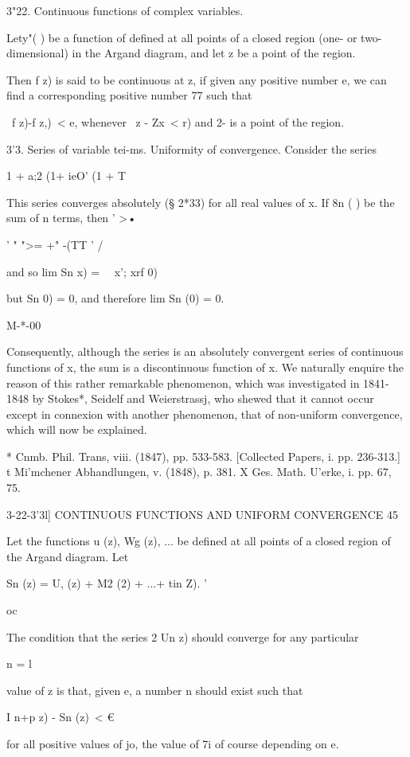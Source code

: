 3"22. Continuous functions of complex variables.

Lety"( ) be a function of defined at all points of a closed region
(one- or two-dimensional) in the Argand diagram, and let z be a point
of the region.

Then f z) is said to be continuous at z, if given any positive number
e, we can find a corresponding positive number 77 such that

\ f z)-f z,)\ < e, whenever \ z - Zx\ < r) and 2- is a point of the
region.

3'3. Series of variable tei-ms. Uniformity of convergence. Consider
the series

  1 + a;2 (1+ ieO' (1 + T

This series converges absolutely (§ 2*33) for all real values of x. If
8n ( ) be the sum of n terms, then ' >•

' " ">= +" -(TT ' /

and so lim Sn x) = \ \ x'; xrf 0)

but Sn 0) = 0, and therefore lim Sn (0) = 0.

M-*-00

Consequently, although the series is an absolutely convergent series
of continuous functions of x, the sum is a discontinuous function of
x. We naturally enquire the reason of this rather remarkable
phenomenon, which was investigated in 1841-1848 by Stokes*, Seidelf
and Weierstrassj, who shewed that it cannot occur except in connexion
with another phenomenon, that of non-uniform convergence, which will
now be explained.

* Cnmb. Phil. Trans, viii. (1847), pp. 533-583. [Collected Papers, i.
pp. 236-313.] t Mi'mchener Abhandlungen, v. (1848), p. 381. X Ges.
Math. U'erke, i. pp. 67, 75.



3-22-3'3l] CONTINUOUS FUNCTIONS AND UNIFORM CONVERGENCE 45

Let the functions u (z), Wg (z), ... be defined at all points of a
closed region of the Argand diagram. Let

Sn (z) = U, (z) + M2 (2) + ...+ tin Z). '

oc

The condition that the series 2 Un z) should converge for any
particular

n = l

value of z is that, given e, a number n should exist such that

I n+p z) - Sn (z)\ < €

for all positive values of jo, the value of 7i of course depending on
e.

